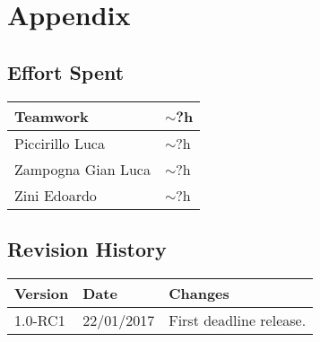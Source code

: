 \section{Appendix}


\subsection{Effort Spent}
\begin{tabular}{| p{5cm} | p{5cm} |}
\hline
Teamwork & $\sim$?h\\
\hline
Piccirillo Luca & $\sim$?h\\
\hline
Zampogna Gian Luca & $\sim$?h\\
\hline
Zini Edoardo & $\sim$?h\\
\hline
\end{tabular}


\subsection{Revision History}
\begin{tabular}{| l | l | p{10cm} |}
\hline
\textbf{Version} & \textbf{Date} & \textbf{Changes}\\
\hline
1.0-RC1 & 22/01/2017 & First deadline release.\\
\hline
\end{tabular}